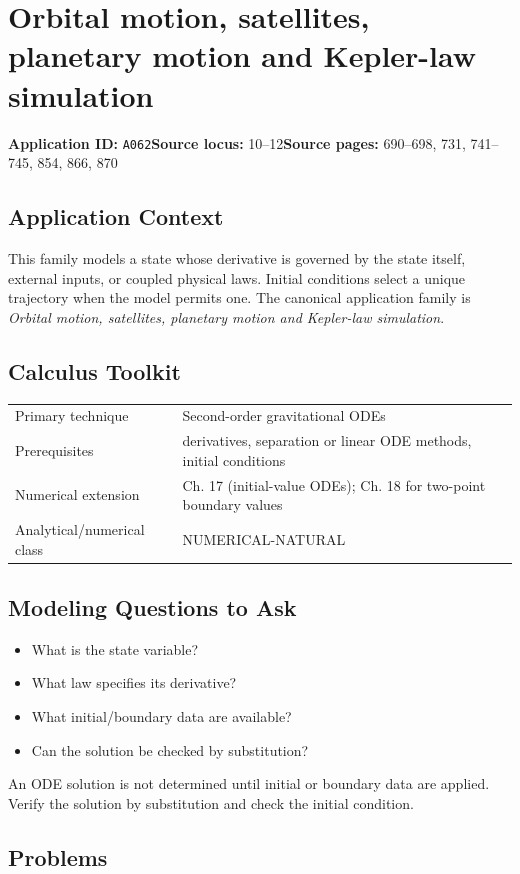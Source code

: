 \documentclass[11pt]{book}
\newcommand{\pid}[1]{\texttt{#1}}
\begin{document}
\chapter{Orbital motion, satellites, planetary motion and Kepler-law simulation}\label{app:A062}
\textbf{Application ID:} \pid{A062}\quad \textbf{Source locus:} 10–12\quad \textbf{Source pages:} 690–698, 731, 741–745, 854, 866, 870
\section*{Application Context}
This family models a state whose derivative is governed by the state itself, external inputs, or coupled physical laws. Initial conditions select a unique trajectory when the model permits one. The canonical application family is \emph{Orbital motion, satellites, planetary motion and Kepler-law simulation}.
\section*{Calculus Toolkit}
\begin{tabularx}{\textwidth}{@{}lX@{}}\toprule
Primary technique & Second-order gravitational ODEs \\
Prerequisites & derivatives, separation or linear ODE methods, initial conditions \\
Numerical extension & Ch. 17 (initial-value ODEs); Ch. 18 for two-point boundary values \\
Analytical/numerical class & NUMERICAL-NATURAL \\
\bottomrule\end{tabularx}
\section*{Modeling Questions to Ask}\begin{itemize}
\item What is the state variable?
\item What law specifies its derivative?
\item What initial/boundary data are available?
\item Can the solution be checked by substitution?
\end{itemize}
\begin{errorbox}An ODE solution is not determined until initial or boundary data are applied. Verify the solution by substitution and check the initial condition.\end{errorbox}
\section*{Problems}
\end{document}
